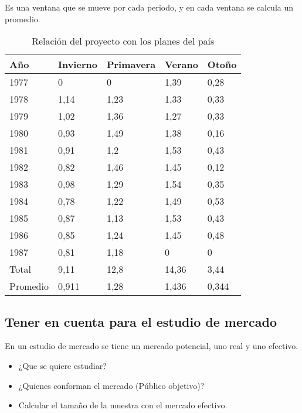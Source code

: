 \documentclass[a4paper, 11pt, oneside]{article}
\begin{document}
Es una ventana que se mueve por cada periodo, y en cada ventana se calcula un promedio.

\begin{table}
	\begin{center}
	\caption{Relación del proyecto con los planes del país}
	\begin{tabular}{ | p{1.5cm} | p{1.5cm} | p{1.5cm} | p{1.5cm} | p{1.5cm} | }
	\hline
	Año & Invierno & Primavera & Verano & Otoño\\
	\hline
	1977 & 0 & 0 & 1,39 & 0,28\\
	\hline
	1978 & 1,14 & 1,23 & 1,33 & 0,33\\
	\hline
	1979 & 1,02 & 1,36 & 1,27 & 0,33\\
	\hline
	1980 & 0,93 & 1,49 & 1,38 & 0,16\\
	\hline
	1981 & 0,91 & 1,2 & 1,53 & 0,43\\
	\hline
	1982 & 0,82 & 1,46 & 1,45 & 0,12\\
	\hline
	1983 & 0,98 & 1,29 & 1,54 & 0,35\\
	\hline
	1984 & 0,78 & 1,22 & 1,49 & 0,53\\
	\hline
	1985 & 0,87 & 1,13 & 1,53 & 0,43\\
	\hline
	1986 & 0,85 & 1,24 & 1,45 & 0,48\\
	\hline
	1987 & 0,81 & 1,18 & 0 & 0\\
	\hline
	Total & 9,11 & 12,8 & 14,36 & 3,44\\
	\hline
	Promedio & 0,911 & 1,28 & 1,436 & 0,344\\
	\hline
	\end{tabular}
	\end{center}
	\label{nacional}
\end{table}

\subsection{Tener en cuenta para el estudio de mercado}

En un estudio de mercado se tiene un mercado potencial, uno real y uno efectivo.

\begin{itemize}
	\item ¿Que se quiere estudiar?
	\item ¿Quienes conforman el mercado (Público objetivo)?
	\item Calcular el tamaño de la muestra con el mercado efectivo.
\end{itemize}
\end{document}
